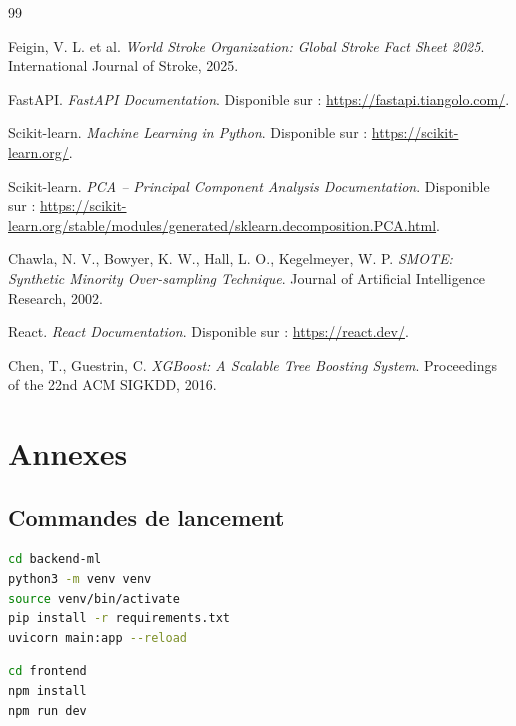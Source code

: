 \documentclass[12pt,a4paper]{report}
\begin{document}
\begin{thebibliography}{99}

Feigin, V. L. et al. \textit{World Stroke Organization: Global Stroke Fact Sheet 2025}. International Journal of Stroke, 2025.

FastAPI. \textit{FastAPI Documentation}. Disponible sur : \url{https://fastapi.tiangolo.com/}.

Scikit-learn. \textit{Machine Learning in Python}. Disponible sur : \url{https://scikit-learn.org/}.

Scikit-learn. \textit{PCA -- Principal Component Analysis Documentation}. Disponible sur : \url{https://scikit-learn.org/stable/modules/generated/sklearn.decomposition.PCA.html}.

Chawla, N. V., Bowyer, K. W., Hall, L. O., Kegelmeyer, W. P. \textit{SMOTE: Synthetic Minority Over-sampling Technique}. Journal of Artificial Intelligence Research, 2002.

React. \textit{React Documentation}. Disponible sur : \url{https://react.dev/}.

Chen, T., Guestrin, C. \textit{XGBoost: A Scalable Tree Boosting System}. Proceedings of the 22nd ACM SIGKDD, 2016.

\end{thebibliography}

\appendix
\chapter{Annexes}

\section{Commandes de lancement}
\begin{lstlisting}[language=bash,caption={Lancement du backend}]
cd backend-ml
python3 -m venv venv
source venv/bin/activate
pip install -r requirements.txt
uvicorn main:app --reload
\end{lstlisting}

\begin{lstlisting}[language=bash,caption={Lancement du frontend}]
cd frontend
npm install
npm run dev
\end{lstlisting}
\end{document}
